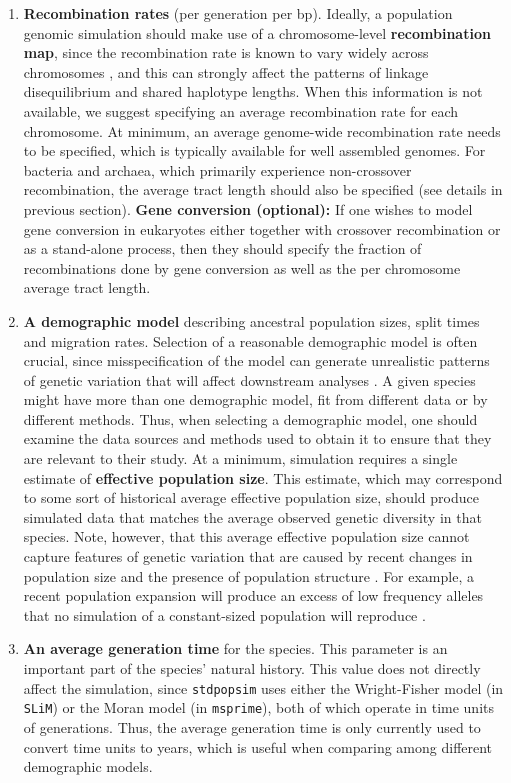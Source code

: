 \documentclass[hidelinks]{article}
\newcommand{\stdpopsim}{\texttt{stdpopsim}\xspace}
\begin{document}
\begin{enumerate}
\item
  \textbf{Recombination rates} (per generation per bp).
  Ideally, a population genomic simulation should make use of a chromosome-level \textbf{recombination map}, 
  since the recombination rate is known to vary widely across chromosomes \citep{Nachman2002},
  and this can strongly affect the patterns of linkage disequilibrium and shared haplotype lengths.
  When this information is not available, we suggest specifying an average recombination rate for each chromosome.
  At minimum, an average genome-wide recombination rate needs to be specified, which is typically available for well assembled genomes.
  For bacteria and archaea, which primarily experience non-crossover recombination,
  the average tract length should also be specified
  (see details in previous section).
  \textbf{Gene conversion (optional):} If one wishes to model gene conversion in eukaryotes either together with crossover recombination or as a stand-alone process,
  then they should specify the fraction of recombinations done by gene conversion
  as well as the per chromosome average tract length.

\item
  \textbf{A demographic model} describing 
  ancestral population sizes, split times and migration rates.
  Selection of a reasonable demographic model is often crucial,
  since misspecification of the model can generate unrealistic patterns of genetic variation that will affect downstream analyses \citep[e.g.,][]{Navascues2009}.
  A given species might have more than one demographic model, fit from different data or by different methods.
  Thus, when selecting a demographic model, one should examine the data sources and methods used to obtain it to ensure that they are relevant to their study.
  At a minimum, simulation requires a single estimate of \textbf{effective population size}. This estimate, which may correspond to some sort of historical average effective population size,
  should produce simulated data that matches the average observed genetic diversity in that species. Note, however, that this average effective population size cannot capture features of genetic variation that are caused by recent changes in population size and the presence of population structure \citep{MacLeod2013,Eldon2015}.
  For example, a recent population expansion will produce
  an excess of low frequency alleles that no simulation of a constant-sized
  population will reproduce \citep{Tennessen2012}.

\item
  \textbf{An average generation time} for the species.
  This parameter is an important part of the species' natural history.
  This value does not directly affect the simulation, since
  \stdpopsim uses either the Wright-Fisher model (in \texttt{SLiM}) or the Moran model (in \texttt{msprime}),
  both of which operate in time units of generations. 
  Thus, the average generation time is only currently used to convert time units to years, 
  which is useful when comparing among different demographic models.

\end{enumerate}
\end{document}
